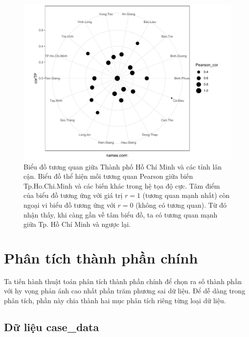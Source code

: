 \documentclass[../thesis.tex]{subfiles}
\begin{document}
\begin{figure}[H]
	\centering
	\includegraphics[width=0.7\linewidth]{images/Pearson}
	\caption[Biểu đồ tương quan giữa Thành phố Hồ Chí Minh và các tỉnh lân cận]{Biểu đồ tương quan giữa Thành phố Hồ Chí Minh và các tỉnh lân cận. Biểu đồ thể hiện mối tương quan Pearson giữa biến Tp.Ho.Chi.Minh và các biến khác trong hệ tọa độ cực. Tâm điểm của biểu đồ tương ứng với giá trị $ r=1 $ (tương quan mạnh nhất) còn ngoại vi biểu đồ tương ứng với $ r=0 $ (không có tương quan). Từ đó nhận thấy, khi càng gần về tâm biểu đồ, ta có tương quan mạnh giữa Tp. Hồ Chí Minh và ngược lại.}
	\label{fig:pearson}
\end{figure}

\newpage
\section{Phân tích thành phần chính}

Ta tiến hành thuật toán phân tích thành phần chính để chọn ra số thành phần với hy vọng phản ánh cao nhất phần trăm phương sai dữ liệu. Để dễ dàng trong phân tích, phần này chia thành hai mục phân tích riêng từng loại dữ liệu.

\subsection{Dữ liệu \textbf{\textsf{case\_data}}}
\begin{Shaded}
	\begin{Highlighting}[]
\SpecialCharTok{\%\textgreater{}\%}\SpecialCharTok{::}
		 \NormalTok{)}
	\end{Highlighting}
\end{Shaded}
\end{document}
